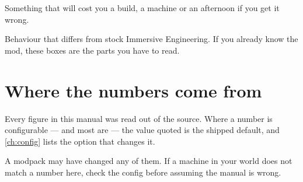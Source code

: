 \begin{iewarning}
Something that will cost you a build, a machine or an afternoon if you get it wrong.
\end{iewarning}

\begin{iefork}
Behaviour that differs from stock Immersive Engineering. If you already know the mod, these boxes
are the parts you have to read.
\end{iefork}

\section{Where the numbers come from}

Every figure in this manual was read out of the source. Where a number is configurable --- and most
are --- the value quoted is the shipped default, and \autoref{ch:config} lists the option that
changes it.

\begin{iewarning}
A modpack may have changed any of them. If a machine in your world does not match a number here,
check the config before assuming the manual is wrong.
\end{iewarning}
